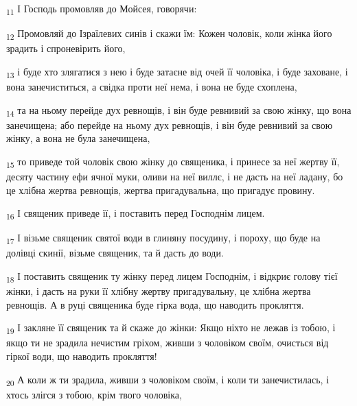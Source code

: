 \begin{tcolorbox}
\textsubscript{11} І Господь промовляв до Мойсея, говорячи:
\end{tcolorbox}
\begin{tcolorbox}
\textsubscript{12} Промовляй до Ізраїлевих синів і скажи їм: Кожен чоловік, коли жінка його зрадить і спроневірить його,
\end{tcolorbox}
\begin{tcolorbox}
\textsubscript{13} і буде хто злягатися з нею і буде затаєне від очей її чоловіка, і буде заховане, і вона занечиститься, а свідка проти неї нема, і вона не буде схоплена,
\end{tcolorbox}
\begin{tcolorbox}
\textsubscript{14} та на ньому перейде дух ревнощів, і він буде ревнивий за свою жінку, що вона занечищена; або перейде на ньому дух ревнощів, і він буде ревнивий за свою жінку, а вона не була занечищена,
\end{tcolorbox}
\begin{tcolorbox}
\textsubscript{15} то приведе той чоловік свою жінку до священика, і принесе за неї жертву її, десяту частину ефи ячної муки, оливи на неї виллє, і не дасть на неї ладану, бо це хлібна жертва ревнощів, жертва пригадувальна, що пригадує провину.
\end{tcolorbox}
\begin{tcolorbox}
\textsubscript{16} І священик приведе її, і поставить перед Господнім лицем.
\end{tcolorbox}
\begin{tcolorbox}
\textsubscript{17} І візьме священик святої води в глиняну посудину, і пороху, що буде на долівці скинії, візьме священик, та й дасть до води.
\end{tcolorbox}
\begin{tcolorbox}
\textsubscript{18} І поставить священик ту жінку перед лицем Господнім, і відкриє голову тієї жінки, і дасть на руки її хлібну жертву пригадувальну, це хлібна жертва ревнощів. А в руці священика буде гірка вода, що наводить прокляття.
\end{tcolorbox}
\begin{tcolorbox}
\textsubscript{19} І закляне її священик та й скаже до жінки: Якщо ніхто не лежав із тобою, і якщо ти не зрадила нечистим гріхом, живши з чоловіком своїм, очисться від гіркої води, що наводить прокляття!
\end{tcolorbox}
\begin{tcolorbox}
\textsubscript{20} А коли ж ти зрадила, живши з чоловіком своїм, і коли ти занечистилась, і хтось злігся з тобою, крім твого чоловіка,
\end{tcolorbox}
